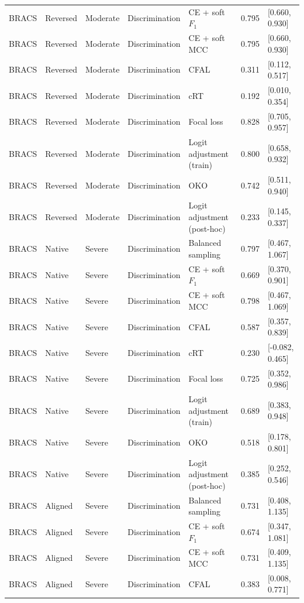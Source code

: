 \begin{longtable}{lllllll}
BRACS & Reversed & Moderate & Discrimination & CE + soft $F_1$ & 0.795 & [0.660, 0.930] \\
BRACS & Reversed & Moderate & Discrimination & CE + soft MCC & 0.795 & [0.660, 0.930] \\
BRACS & Reversed & Moderate & Discrimination & CFAL & 0.311 & [0.112, 0.517] \\
BRACS & Reversed & Moderate & Discrimination & cRT & 0.192 & [0.010, 0.354] \\
BRACS & Reversed & Moderate & Discrimination & Focal loss & 0.828 & [0.705, 0.957] \\
BRACS & Reversed & Moderate & Discrimination & Logit adjustment (train) & 0.800 & [0.658, 0.932] \\
BRACS & Reversed & Moderate & Discrimination & OKO & 0.742 & [0.511, 0.940] \\
BRACS & Reversed & Moderate & Discrimination & Logit adjustment (post-hoc) & 0.233 & [0.145, 0.337] \\
BRACS & Native & Severe & Discrimination & Balanced sampling & 0.797 & [0.467, 1.067] \\
BRACS & Native & Severe & Discrimination & CE + soft $F_1$ & 0.669 & [0.370, 0.901] \\
BRACS & Native & Severe & Discrimination & CE + soft MCC & 0.798 & [0.467, 1.069] \\
BRACS & Native & Severe & Discrimination & CFAL & 0.587 & [0.357, 0.839] \\
BRACS & Native & Severe & Discrimination & cRT & 0.230 & [-0.082, 0.465] \\
BRACS & Native & Severe & Discrimination & Focal loss & 0.725 & [0.352, 0.986] \\
BRACS & Native & Severe & Discrimination & Logit adjustment (train) & 0.689 & [0.383, 0.948] \\
BRACS & Native & Severe & Discrimination & OKO & 0.518 & [0.178, 0.801] \\
BRACS & Native & Severe & Discrimination & Logit adjustment (post-hoc) & 0.385 & [0.252, 0.546] \\
BRACS & Aligned & Severe & Discrimination & Balanced sampling & 0.731 & [0.408, 1.135] \\
BRACS & Aligned & Severe & Discrimination & CE + soft $F_1$ & 0.674 & [0.347, 1.081] \\
BRACS & Aligned & Severe & Discrimination & CE + soft MCC & 0.731 & [0.409, 1.135] \\
BRACS & Aligned & Severe & Discrimination & CFAL & 0.383 & [0.008, 0.771] \\

\end{longtable}
